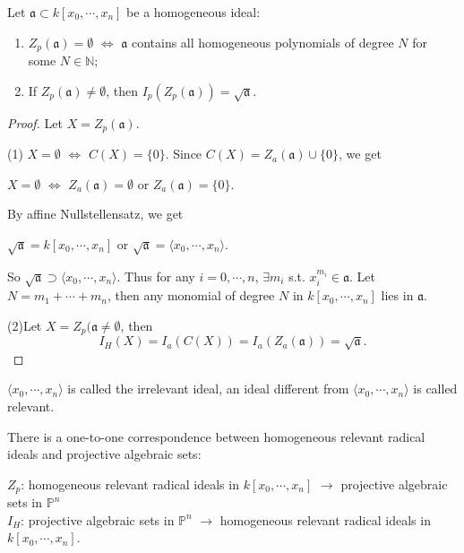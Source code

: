 \begin{theorem}
	Let $ \mathfrak{a}\subset k[x_0,\cdots,x_n] $ be a homogeneous ideal:
	\begin{enumerate}
		\item $ Z_p(\mathfrak{a})=\emptyset $ $ \Leftrightarrow $ $ \mathfrak{a} $ contains all homogeneous polynomials of degree $ N $ for some $ N\in \mathbb{N} $;
		\item If $ Z_p(\mathfrak{a})\neq \emptyset $, then $ I_p(Z_p(\mathfrak{a}))=\sqrt{\mathfrak{a}} $.
	\end{enumerate}
\end{theorem}
\begin{proof}
	Let $ X=Z_p(\mathfrak{a}) $.

	(1) $ X=\emptyset $ $ \Leftrightarrow $ $ C(X)=\{ 0 \} $. Since $ C(X)=Z_a(\mathfrak{a})\cup \{0\} $, we get
	\begin{center}
		$ X=\emptyset $ $ \Leftrightarrow $ $ Z_a(\mathfrak{a})=\emptyset $ or $ Z_a(\mathfrak{a})=\{0\} $.
	\end{center}
	By affine Nullstellensatz, we get
	\begin{center}
		$ \sqrt{\mathfrak{a}}=k[x_0,\cdots,x_n] $ or $ \sqrt{\mathfrak{a}}=\langle x_0,\cdots,x_n\rangle $.
	\end{center}
	So $ \sqrt{\mathfrak{a}}\supset \langle x_0,\cdots,x_n\rangle $. Thus for any $ i=0,\cdots,n $, $ \exists m_i $ s.t. $ x_i^{m_i}\in \mathfrak{a} $. Let $ N=m_1+\cdots+m_n $, then any monomial of degree $ N $ in $ k[x_0,\cdots,x_n] $ lies in $ \mathfrak{a} $.

	(2)Let $ X=Z_p(\mathfrak{a}\neq \emptyset $, then
	\begin{equation}
		I_H(X)=I_a(C(X))=I_a(Z_a(\mathfrak{a}))=\sqrt{\mathfrak{a}}.
	\end{equation}
\end{proof}
\begin{remark}
	$ \langle x_0,\cdots,x_n \rangle $ is called the irrelevant ideal, an ideal different from $ \langle x_0,\cdots,x_n \rangle $ is called relevant.
\end{remark}
\begin{corollary}
	There is a one-to-one correspondence between homogeneous relevant radical ideals and projective algebraic sets:
	\begin{center}
		$ Z_p $: homogeneous relevant radical ideals in $ k[x_0,\cdots,x_n] $ $ \to $  projective algebraic sets in  $ \mathbb{P}^n $\\
		$ I_H $: projective algebraic sets in $ \mathbb{P}^n $ $ \to $ homogeneous relevant radical ideals in $ k[x_0,\cdots,x_n] $.
	\end{center}
\end{corollary}
